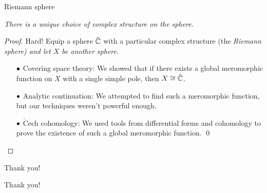 \documentclass{beamer}
\begin{document}
    \begin{frame}{Riemann sphere}
        \begin{theorem}[Uniformization]
            \textit{There is a unique choice of complex structure on the sphere.}
        \end{theorem}

        \pause

        \begin{proof}
            Hard!
            \pause
            Equip a sphere $\hat{\mathbb{C}}$ with a particular complex structure (the \it{Riemann sphere}) and let $X$ be another sphere.
            \pause
            \begin{itemize}
                \item[\scriptsize$\bullet$] \scriptsize Covering space theory: We showed that if there exists a global meromorphic function on $X$ with a single simple pole, then $X\cong\hat{\mathbb{C}}$.
                    \pause
                \item[\scriptsize$\bullet$] \scriptsize Analytic continuation: We attempted to find such a meromorphic function, but our techniques weren't powerful enough.
                    \pause
                \item[\scriptsize$\bullet$] \scriptsize $\check{\textrm{C}}$ech cohomology: We used tools from differential forms and cohomology to prove the existence of such a global meromorphic function.
                    \pause\qed
            \end{itemize}
        \end{proof}
    \end{frame}
    \begin{frame}{Thank you!}
        \begin{center}
            Thank you!
        \end{center}
    \end{frame}
\end{document}
